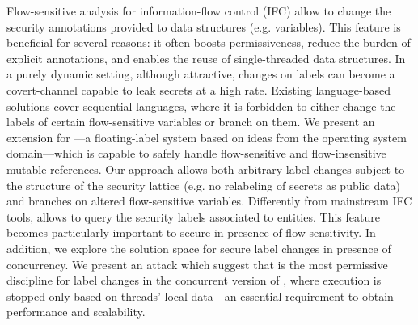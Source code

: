 Flow-sensitive analysis for information-flow control (IFC) allow to change the
security annotations provided to data structures (e.g. variables). This feature
is beneficial for several reasons: it often boosts permissiveness, reduce the
burden of explicit annotations, and enables the reuse of single-threaded data
structures. In a purely dynamic setting, although attractive, changes on labels
can become a covert-channel capable to leak secrets at a high rate. Existing
language-based solutions cover sequential languages, where it is forbidden to
either change the labels of certain flow-sensitive variables or branch on them.
We present an extension for {\LIO}---a floating-label system based on ideas from
the operating system domain---which is capable to safely handle flow-sensitive
and flow-insensitive mutable references. Our approach allows both arbitrary
label changes subject to the structure of the security lattice (e.g. no
relabeling of secrets as public data) and branches on altered flow-sensitive
variables.  Differently from mainstream IFC tools, {\LIO} allows to query the
security labels associated to entities. This feature becomes particularly
important to secure in presence of flow-sensitivity. In addition, we explore the
solution space for secure label changes in presence of concurrency. We present
an attack which suggest that \emph{{\nsu}} is the most permissive
discipline for label changes in the concurrent version of {\LIO}, where
execution is stopped only based on threads’ local data---an essential
requirement to obtain performance and scalability.







  




 


